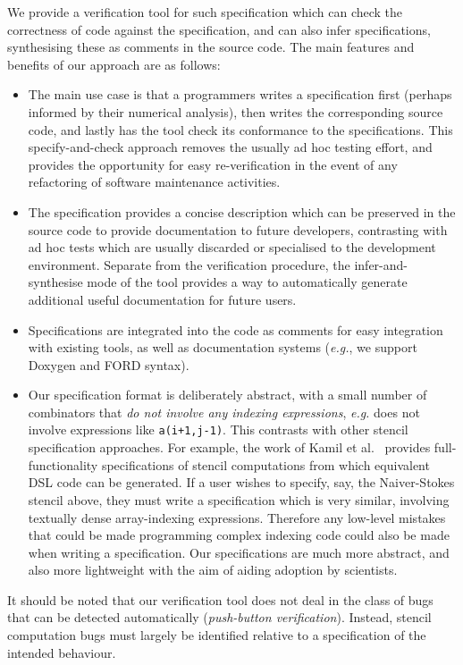 \documentclass[9pt,preprint]{sigplanconf}
\theoremstyle{definition}
\newcommand{\eg}{\emph{e.g.}}
\begin{document}
We provide a verification tool for such specification which can check
the correctness of code against the specification, and can also infer
specifications, synthesising these as comments in the
source code. The main features and benefits of our approach are as follows:
%
\begin{itemize}
\item The main use case is that a programmers writes a specification
  first (perhaps informed by their numerical analysis), then writes
  the corresponding source code, and lastly has the tool check its
  conformance to the specifications. This specify-and-check approach
  removes the usually ad hoc testing effort, and provides the
  opportunity for easy re-verification in the event of any refactoring
  of software maintenance activities.
%
\item The specification provides a concise description which can be
  preserved in the source code to provide documentation to future
  developers, contrasting with ad hoc tests which are usually
  discarded or specialised to the development environment. Separate from the
  verification procedure, the infer-and-synthesise mode of the tool
  provides a way to automatically generate additional useful
  documentation for future users.
%
\item Specifications are integrated into the code as comments for easy
integration with existing tools, as well as
  documentation systems (\eg{}, we support Doxygen and FORD syntax).
%
\item Our specification format is deliberately abstract, with a small
  number of combinators that \emph{do not involve any indexing
    expressions}, \eg{} does not involve expressions like
  \texttt{a(i+1,j-1)}. This contrasts with other stencil specification
  approaches. For example, the work of Kamil et al.~\cite{kamil2016verified}
  provides full-functionality specifications of stencil computations from which
  equivalent DSL code can be generated.  If a user wishes to specify, say, the
  Naiver-Stokes stencil above, they must write a specification which is very
  similar, involving textually dense array-indexing expressions. Therefore any
  low-level mistakes that could be made programming complex indexing code could
  also be made when writing a specification. Our specifications are much more
  abstract, and also more lightweight with the aim of aiding adoption by
  scientists.
\end{itemize}

It should be noted that our verification tool does not deal in the
class of bugs that can be detected automatically (\emph{push-button
  verification}). Instead, stencil computation bugs must largely be
identified relative to a specification of the intended behaviour.
\end{document}
